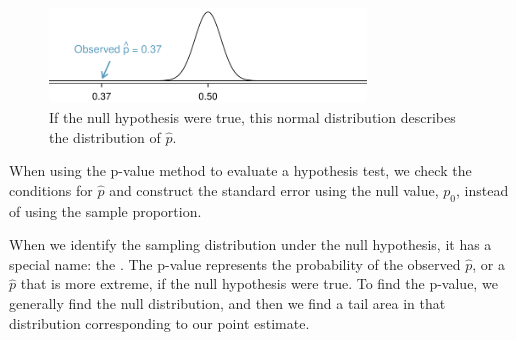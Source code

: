 \begin{figure}[hht]
\centering
\includegraphics[width=0.75\textwidth]{ch_foundations_for_inf/figures/normal_dist_mean_500_se_016/normal_dist_mean_500_se_016}
\caption{
  If the null hypothesis were true, this normal distribution
  describes the distribution of $\hat{p}$.}
\label{normal_dist_mean_500_se_016}
\end{figure}

\begin{tipBox}{
  When using the p-value method to evaluate a hypothesis test,
  we check the conditions for $\hat{p}$ and construct the
  standard error using the null value, $p_0$, instead of using
  the sample proportion.}
\end{tipBox}

When we identify the sampling distribution under the null hypothesis,
it has a special name: the .
The p-value represents the probability of the observed $\hat{p}$,
or a $\hat{p}$ that is more extreme,
if the null hypothesis were true.
To find the p-value, we generally find the null distribution,
and then we find a tail area in that distribution corresponding
to our point estimate.

